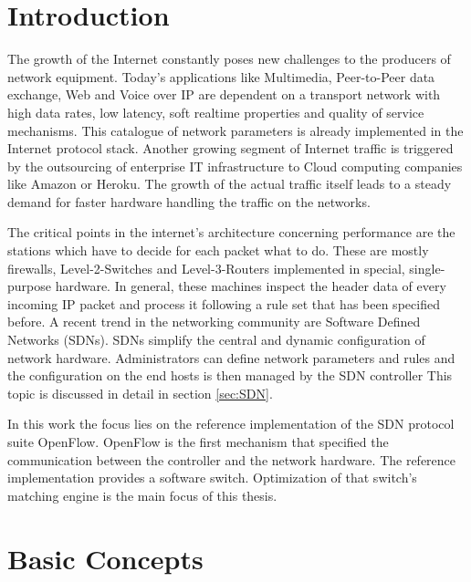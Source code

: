 \documentclass[a4paper,
		12pt,
		parskip=full,
		titlepage
		]{scrartcl}
\begin{document}


\setcounter{page}{1}
\tableofcontents{}

\pagebreak

\pagestyle{scrheadings}

\section{Introduction}
The growth of the Internet constantly poses new challenges to the producers of network equipment.
Today's applications like Multimedia, Peer-to-Peer data exchange, Web and Voice over IP are dependent on a transport network with
high data rates, low latency, soft realtime properties and quality of service mechanisms.
This catalogue of network parameters is already implemented in the Internet protocol stack\cite{rfc3260, rfc3261, rfc5694, rfc3550}.
Another growing segment of Internet traffic is triggered by the outsourcing of 
enterprise IT infrastructure to Cloud computing companies like Amazon or Heroku.
The growth of the actual traffic itself leads to a steady demand for faster hardware handling the traffic on the networks.

The critical points in the internet's architecture concerning performance are the stations which have to decide for each packet what to do.
These are mostly firewalls, Level-2-Switches and Level-3-Routers implemented in special, single-purpose hardware.
In general, these machines inspect the header data of every incoming IP packet and process it 
following a rule set that has been specified before.
A recent trend in the networking community are Software Defined Networks (SDNs).
SDNs simplify the central and dynamic configuration of network hardware\cite{onf_whitepaper}.
Administrators can define network parameters and rules and the configuration on the end hosts is then managed by the SDN controller
This topic is discussed in detail in section \ref{sec:SDN}.

In this work the focus lies on the reference implementation of the SDN protocol suite OpenFlow.
OpenFlow is the first mechanism that specified the communication between the controller and the network hardware.
The reference implementation provides a software switch.
Optimization of that switch's matching engine is the main focus of this thesis.

\section{Basic Concepts}
\end{document}
